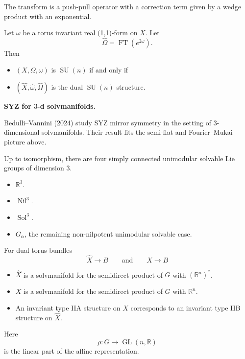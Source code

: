 The transform is a push-pull operator
with a correction term given by a
wedge product with an exponential.

\begin{theorem}
\label{theorem-lau-tseng-yau}
Let $\omega$ be a torus invariant real
(1,1)-form on $X$. Let
$$
\widehat\Omega
=\operatorname{FT}(e^{2\omega}).
$$
Then
\begin{itemize}
\item $(X,\Omega,\omega)$ is
\(\operatorname{SU}(n)\) if and only if
\item $(\widehat X,\widehat\omega,
\widehat\Omega)$ is the dual
\(\operatorname{SU}(n)\) structure.
\end{itemize}
\end{theorem}

\medskip\noindent
{\bf SYZ for $3$-d solvmanifolds.}

Bedulli--Vannini (2024) study SYZ
mirror symmetry in the setting of
$3$-dimensional solvmanifolds.
Their result fits the semi-flat and
Fourier--Mukai picture above.

\medskip\noindent
Up to isomorphism, there are four
simply connected unimodular solvable
Lie groups of dimension $3$.

\begin{itemize}
\item $\mathbb{R}^3$.
\item $\operatorname{Nil}^3$.
\item $\operatorname{Sol}^3$.
\item $G_{\alpha}$, the remaining
non-nilpotent unimodular solvable
case.
\end{itemize}

\begin{theorem}
\label{theorem-bedulli-vannini}
For dual torus bundles
$$
\widehat X\to B
\qquad\text{and}\qquad
X\to B
$$
\begin{itemize}
\item $\widehat X$ is a solvmanifold
for the semidirect product of $G$
with $(\mathbb{R}^n)^*$.
\item $X$ is a solvmanifold for the
semidirect product of $G$ with
$\mathbb{R}^n$.
\item An invariant type IIA structure
on $X$ corresponds to an invariant
type IIB structure on
\(\widehat X\).
\end{itemize}
Here
$$
\rho:G\to\operatorname{GL}(n,\mathbb{R})
$$
is the linear part of the affine
representation.
\end{theorem}

